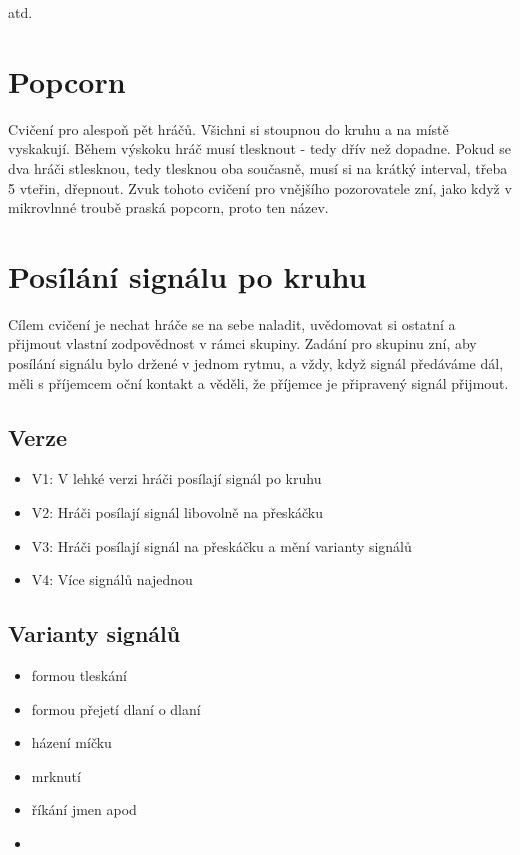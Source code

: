 \documentclass[main.tex]{subfiles}
\begin{document}
atd. 
 
 
 
\needspace{5cm} \section{Popcorn} \label{popcorn} Cvičení pro alespoň pět hráčů. Všichni si stoupnou do kruhu a na místě vyskakují. Během výskoku hráč musí tlesknout - tedy dřív než dopadne. Pokud se dva hráči stlesknou, tedy tlesknou oba současně, musí si na krátký interval, třeba 5 vteřin, dřepnout. Zvuk tohoto cvičení pro vnějšího pozorovatele zní, jako když v mikrovlnné troubě praská popcorn, proto ten název. 
 
 
 
 
 
\needspace{5cm} \section{Posílání signálu po kruhu} \label{posílání signálu po kruhu} Cílem cvičení je nechat hráče se na sebe naladit, uvědomovat si ostatní a přijmout vlastní zodpovědnost v rámci skupiny. Zadání pro skupinu zní, aby posílání signálu bylo držené v jednom rytmu, a vždy, když signál předáváme dál, měli s příjemcem oční kontakt a věděli, že příjemce je připravený signál přijmout. 
 
\subsection{  Verze } \begin{itemize}
\item  V1: V lehké verzi hráči posílají signál po kruhu
\item  V2: Hráči posílají signál libovolně na přeskáčku
\item  V3: Hráči posílají signál na přeskáčku a mění varianty signálů
\item  V4: Více signálů najednou
\end{itemize}
 
\subsection{ Varianty signálů } \begin{itemize}
\item  formou tleskání
\item  formou přejetí dlaní o dlaní
\item  házení míčku
\item  mrknutí
\item  říkání jmen apod
\item  {}
\end{itemize}
 
\end{document}
